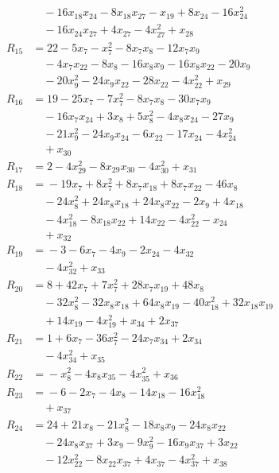 \begin{align*}
&\quad{} -16x_{18}x_{24} -8x_{18}x_{27} -x_{19} +8x_{24} -16x_{24}^{2} \\
&\quad{} -16x_{24}x_{27} +4x_{27} -4x_{27}^{2} +x_{28} \\
R_{15} &={} 22 -5x_{7} -x_{7}^{2} -8x_{7}x_{8} -12x_{7}x_{9} \\
&\quad{} -4x_{7}x_{22} -8x_{8} -16x_{8}x_{9} -16x_{8}x_{22} -20x_{9} \\
&\quad{} -20x_{9}^{2} -24x_{9}x_{22} -28x_{22} -4x_{22}^{2} +x_{29} \\
R_{16} &={} 19 -25x_{7} -7x_{7}^{2} -8x_{7}x_{8} -30x_{7}x_{9} \\
&\quad{} -16x_{7}x_{24} +3x_{8} +5x_{8}^{2} -4x_{8}x_{24} -27x_{9} \\
&\quad{} -21x_{9}^{2} -24x_{9}x_{24} -6x_{22} -17x_{24} -4x_{24}^{2} \\
&\quad{} +x_{30} \\
R_{17} &={} 2 -4x_{29}^{2} -8x_{29}x_{30} -4x_{30}^{2} +x_{31} \\
R_{18} &={} -19x_{7} +8x_{7}^{2} +8x_{7}x_{18} +8x_{7}x_{22} -46x_{8} \\
&\quad{} -24x_{8}^{2} +24x_{8}x_{18} +24x_{8}x_{22} -2x_{9} +4x_{18} \\
&\quad{} -4x_{18}^{2} -8x_{18}x_{22} +14x_{22} -4x_{22}^{2} -x_{24} \\
&\quad{} +x_{32} \\
R_{19} &={} -3 -6x_{7} -4x_{9} -2x_{24} -4x_{32} \\
&\quad{} -4x_{32}^{2} +x_{33} \\
R_{20} &={} 8 +42x_{7} +7x_{7}^{2} +28x_{7}x_{19} +48x_{8} \\
&\quad{} -32x_{8}^{2} -32x_{8}x_{18} +64x_{8}x_{19} -40x_{18}^{2} +32x_{18}x_{19} \\
&\quad{} +14x_{19} -4x_{19}^{2} +x_{34} +2x_{37} \\
R_{21} &={} 1 +6x_{7} -36x_{7}^{2} -24x_{7}x_{34} +2x_{34} \\
&\quad{} -4x_{34}^{2} +x_{35} \\
R_{22} &={} -x_{8}^{2} -4x_{8}x_{35} -4x_{35}^{2} +x_{36} \\
R_{23} &={} -6 -2x_{7} -4x_{8} -14x_{18} -16x_{18}^{2} \\
&\quad{} +x_{37} \\
R_{24} &={} 24 +21x_{8} -21x_{8}^{2} -18x_{8}x_{9} -24x_{8}x_{22} \\
&\quad{} -24x_{8}x_{37} +3x_{9} -9x_{9}^{2} -16x_{9}x_{37} +3x_{22} \\
&\quad{} -12x_{22}^{2} -8x_{22}x_{37} +4x_{37} -4x_{37}^{2} +x_{38} \\

\end{align*}
